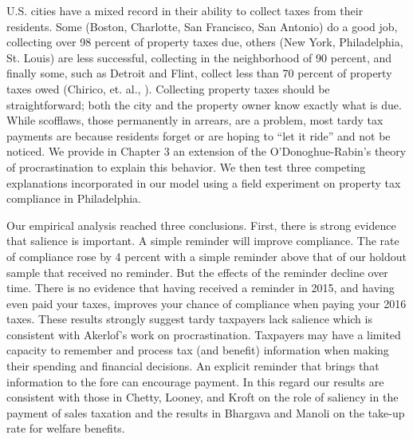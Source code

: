 U.S. cities have a mixed record in their ability to collect taxes from
their residents.  Some (Boston, Charlotte, San Francisco, San Antonio)
do a good job, collecting over 98 percent of property taxes due,
others (New York, Philadelphia, St.  Louis) are less successful,
collecting in the neighborhood of 90 percent, and finally some, such as Detroit and Flint,
collect less than 70 percent of property taxes owed (Chirico, et.
al., \citeyear{CILMS-16}).  Collecting property taxes should be
straightforward; both the city and the property owner know exactly
what is due.  While scofflaws, those permanently in arrears, are a
problem, most tardy tax payments are because residents forget or
are hoping to ``let it ride'' and not be noticed.  We provide in Chapter 3 an
extension of the O'Donoghue-Rabin's \citeyear{DR-99} theory of
procrastination to explain this behavior. We then test three competing explanations
incorporated in our model using a field experiment on property tax
compliance in Philadelphia.

Our empirical analysis reached three conclusions.  First, there is
strong evidence that salience is important.  A simple reminder will improve compliance.  The
rate of compliance rose by 4 percent with a simple reminder above that
of our holdout sample that received no reminder.  But the effects of
the reminder decline over time.  There is no evidence that having
received a reminder in 2015, and having even paid your taxes, improves
your chance of compliance when paying your 2016 taxes.  These results 
strongly suggest tardy taxpayers lack salience which is consistent with Akerlof's \citeyear{Akerlof-91} work
on procrastination.  Taxpayers may have a limited capacity to remember
and process tax (and benefit) information when making their spending
and financial decisions.  An explicit reminder that brings that
information to the fore can encourage payment.  In this regard our
results are consistent with those in Chetty, Looney, and Kroft
\citeyear{chetty2009salience} on the role of saliency in the payment
of sales taxation and the results in Bhargava and Manoli
\citeyear{Bhargava-15} on the take-up rate for welfare benefits.

